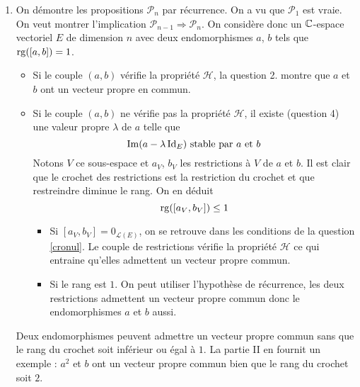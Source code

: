 \begin{enumerate}
\item On démontre les propositions $\mathcal{P}_n$ par récurrence. On a vu que $\mathcal{P}_1$ est vraie. On veut montrer l'implication $\mathcal{P}_{n-1}\Rightarrow \mathcal{P}_n$.\newline
On considère donc un $\mathbb{C}$-espace vectoriel $E$ de dimension $n$ avec deux endomorphismes $a$, $b$ tels que $\operatorname{rg}([a,b])=1$.
\begin{itemize}
  \item Si le couple $(a,b)$ vérifie la propriété $\mathcal{H}$, la question 2. montre que $a$ et $b$ ont un vecteur propre en commun.
  \item Si le couple $(a,b)$ ne vérifie pas la propriété $\mathcal{H}$, il existe (question 4) une valeur propre $\lambda$ de $a$ telle que 
\begin{displaymath}
 \operatorname{Im}(a-\lambda \operatorname{Id}_E) \text{ stable par $a$ et $b$}
\end{displaymath}
Notons $V$ ce sous-espace et $a_V$, $b_V$ les restrictions à $V$ de $a$ et $b$. Il est clair que le crochet des restrictions est la restriction du crochet et que restreindre diminue le rang. On en déduit
\begin{displaymath}
  \operatorname{rg}([a_V,b_V]) \leq 1
\end{displaymath}
\begin{itemize}
  \item Si $[a_V,b_V]=0_{\mathcal{L}(E)}$, on se retrouve dans les conditions de la question \ref{cronul}. Le couple de restrictions vérifie la propriété $\mathcal{H}$ ce qui entraine qu'elles admettent un vecteur propre commun.
  \item Si le rang est $1$. On peut utiliser l'hypothèse de récurrence, les deux restrictions admettent un vecteur propre commun donc le endomorphismes $a$ et $b$ aussi.
\end{itemize}
\end{itemize}

Deux endomorphismes peuvent admettre un vecteur propre commun sans que le rang du crochet soit inférieur ou égal à $1$. La partie II en fournit un exemple : $a^2$ et $b$ ont un vecteur propre commun bien que le rang du crochet soit $2$.

\end{enumerate}
